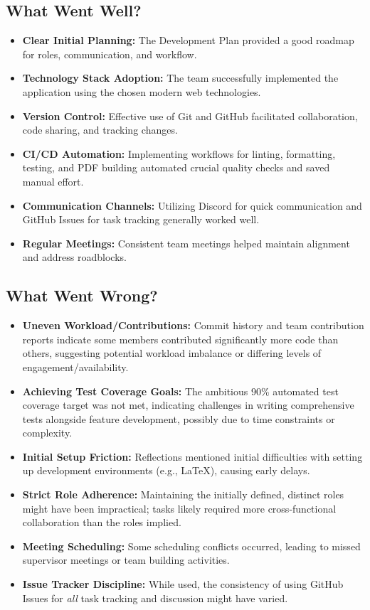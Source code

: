 \documentclass{article}
\begin{document}
\subsection{What Went Well?}

\begin{itemize}
  \item \textbf{Clear Initial Planning:} The Development Plan provided a good roadmap for roles, communication, and workflow.
  \item \textbf{Technology Stack Adoption:} The team successfully implemented the application using the chosen modern web technologies.
  \item \textbf{Version Control:} Effective use of Git and GitHub facilitated collaboration, code sharing, and tracking changes.
  \item \textbf{CI/CD Automation:} Implementing workflows for linting, formatting, testing, and PDF building automated crucial quality checks and saved manual effort.
  \item \textbf{Communication Channels:} Utilizing Discord for quick communication and GitHub Issues for task tracking generally worked well.
  \item \textbf{Regular Meetings:} Consistent team meetings helped maintain alignment and address roadblocks.
\end{itemize}

\subsection{What Went Wrong?}

\begin{itemize}
  \item \textbf{Uneven Workload/Contributions:} Commit history and team contribution reports indicate some members contributed significantly more code than others, suggesting potential workload imbalance or differing levels of engagement/availability.
  \item \textbf{Achieving Test Coverage Goals:} The ambitious 90\% automated test coverage target was not met, indicating challenges in writing comprehensive tests alongside feature development, possibly due to time constraints or complexity.
  \item \textbf{Initial Setup Friction:} Reflections mentioned initial difficulties with setting up development environments (e.g., LaTeX), causing early delays.
  \item \textbf{Strict Role Adherence:} Maintaining the initially defined, distinct roles might have been impractical; tasks likely required more cross-functional collaboration than the roles implied.
  \item \textbf{Meeting Scheduling:} Some scheduling conflicts occurred, leading to missed supervisor meetings or team building activities.
  \item \textbf{Issue Tracker Discipline:} While used, the consistency of using GitHub Issues for \textit{all} task tracking and discussion might have varied.
\end{itemize}
\end{document}
